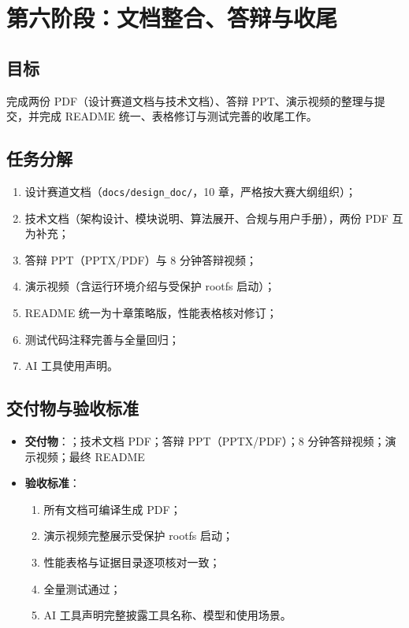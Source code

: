\section{第六阶段：文档整合、答辩与收尾}

\subsection{目标}
完成两份 PDF（设计赛道文档与技术文档）、答辩 PPT、演示视频的整理与提交，并完成 README 统一、表格修订与测试完善的收尾工作。

\subsection{任务分解}
\begin{enumerate}
    \item 设计赛道文档（\texttt{docs/design\_doc/}，10 章，严格按大赛大纲组织）；
    \item 技术文档（架构设计、模块说明、算法展开、合规与用户手册），两份 PDF 互为补充；
    \item 答辩 PPT（PPTX/PDF）与 8 分钟答辩视频；
    \item 演示视频（含运行环境介绍与受保护 rootfs 启动）；
    \item README 统一为十章策略版，性能表格核对修订；
    \item 测试代码注释完善与全量回归；
    \item AI 工具使用声明。
\end{enumerate}

\subsection{交付物与验收标准}
\begin{itemize}
    \item \textbf{交付物}：\texttt{}；技术文档 PDF；答辩 PPT（PPTX/PDF）；8 分钟答辩视频；演示视频；最终 README
    \item \textbf{验收标准}：
    \begin{enumerate}
        \item 所有文档可编译生成 PDF；
        \item 演示视频完整展示受保护 rootfs 启动；
        \item 性能表格与证据目录逐项核对一致；
        \item 全量测试通过；
        \item AI 工具声明完整披露工具名称、模型和使用场景。
    \end{enumerate}
\end{itemize}

